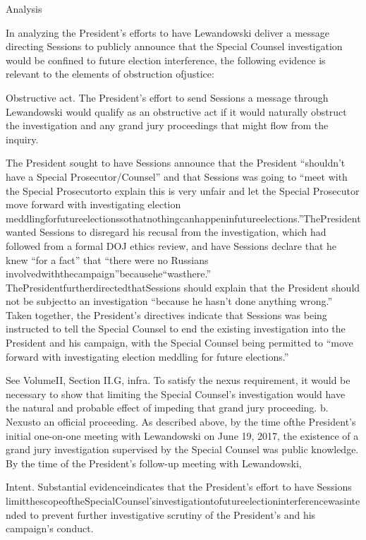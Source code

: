 {Analysis

In analyzing the President’s efforts to have Lewandowski deliver a message directing Sessions to publicly announce that the Special Counsel investigation would be confined to future election interference, the following evidence is relevant to the elements of obstruction ofjustice:

Obstructive act. The President’s effort to send Sessions a message through Lewandowski would qualify as an obstructive act if it would naturally obstruct the investigation and any grand jury proceedings that might flow from the inquiry.

The President sought to have Sessions announce that the President “shouldn’t have a Special Prosecutor/Counsel” and that Sessions was going to “meet with the Special Prosecutorto explain this is very unfair and let the Special Prosecutor move forward with investigating election meddlingforfutureelectionssothatnothingcanhappeninfutureelections.”ThePresidentwanted Sessions to disregard his recusal from the investigation, which had followed from a formal DOJ ethics review, and have Sessions declare that he knew “for a fact” that “there were no Russians involvedwiththecampaign”becausehe“wasthere.” ThePresidentfurtherdirectedthatSessions should explain that the President should not be subjectto an investigation “because he hasn’t done anything wrong.” Taken together, the President’s directives indicate that Sessions was being instructed to tell the Special Counsel to end the existing investigation into the President and his campaign, with the Special Counsel being permitted to “move forward with investigating election meddling for future elections.”

See VolumeII, Section II.G, infra. To satisfy the nexus requirement, it would be necessary to show that limiting the Special Counsel’s investigation would have the
natural and probable effect of impeding that grand jury proceeding.
b. Nexusto an official proceeding. As described above, by the time ofthe President’s initial one-on-one meeting with Lewandowski on June 19, 2017, the existence of a grand jury investigation supervised by the Special Counsel was public knowledge. By the time of the President’s follow-up meeting with Lewandowski,

Intent. Substantial evidenceindicates that the President’s effort to have Sessions limitthescopeoftheSpecialCounsel’sinvestigationtofutureelectioninterferencewasintended to prevent further investigative scrutiny of the President’s and his campaign’s conduct.

}
